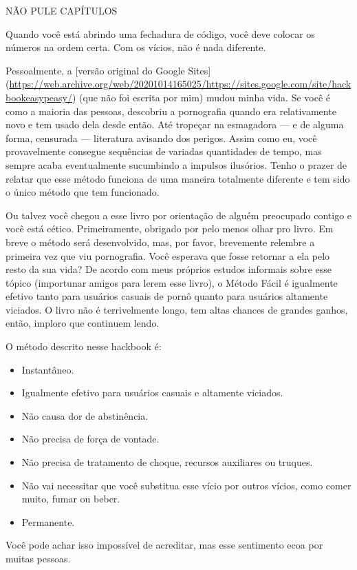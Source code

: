\documentclass[
  spanish,
  openany]{book}
\providecommand{\tightlist}{%
  \setlength{\itemsep}{0pt}\setlength{\parskip}{0pt}}
\let\oldurl\url
\renewcommand\url{\renewcommand\UrlFont{\ttfamily\color{linkcolor}}\oldurl}
\begin{document}
{NÃO PULE CAPÍTULOS}

Quando você está abrindo uma fechadura de código, você deve colocar os números na ordem certa. Com os vícios, não é nada diferente.

Pessoalmente, a {[}versão original do Google Sites{]} (\url{https://web.archive.org/web/20201014165025/https://sites.google.com/site/hackbookeasypeasy/}) (que não foi escrita por mim) mudou minha vida. Se você é como a maioria das pessoas, descobriu a pornografia quando era relativamente novo e tem usado dela desde então. Até tropeçar na esmagadora --- e de alguma forma, censurada ---
literatura avisando dos perigos. Assim como eu, você provavelmente consegue sequências de variadas quantidades de tempo, mas sempre acaba eventualmente sucumbindo a impulsos ilusórios. Tenho o prazer de relatar que esse método funciona de uma maneira totalmente diferente e tem sido o único método que tem funcionado.

Ou talvez você chegou a esse livro por orientação de alguém preocupado contigo e você está cético. Primeiramente, obrigado por pelo menos olhar pro livro. Em breve o método será desenvolvido, mas, por favor, brevemente relembre a primeira vez que viu pornografia. Você esperava que fosse retornar a ela pelo resto da sua vida? De acordo com meus próprios estudos informais sobre esse tópico (importunar amigos para lerem esse livro), o Método Fácil é igualmente efetivo tanto para usuários casuais de pornô quanto para usuários altamente viciados. O livro não é terrivelmente longo, tem altas chances de grandes ganhos, então, imploro que continuem lendo.

O método descrito nesse hackbook é:

\begin{itemize}
\tightlist
\item
  Instantâneo.
\item
  Igualmente efetivo para usuários casuais e altamente viciados.
\item
  Não causa dor de abstinência.
\item
  Não precisa de força de vontade.
\item
  Não precisa de tratamento de choque, recursos auxiliares ou truques.
\item
  Não vai necessitar que você substitua esse vício por outros vícios, como comer muito, fumar ou beber.
\item
  Permanente.
\end{itemize}

Você pode achar isso impossível de acreditar, mas esse sentimento ecoa por muitas pessoas.
\end{document}
